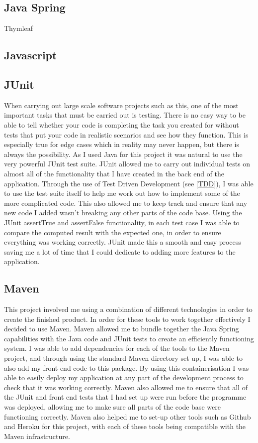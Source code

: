 \subsection{Java Spring \label{JavaSpring}}
Thymleaf

\subsection{Javascript}

\subsection{JUnit}

When carrying out large scale software projects such as this, one of the most important tasks that must be carried out is testing. There is no easy way to be able to tell whether your code is completing the task you created for without tests that put your code in realistic scenarios and see how they function. This is especially true for edge cases which in reality may never happen, but there is always the possibility. As I used Java for this project it was natural to use the very powerful JUnit test suite. JUnit allowed me to carry out individual tests on almost all of the functionality that I have created in the back end of the application. Through the use of Test Driven Development (see \ref{TDD}), I was able to use the test suite itself to help me work out how to implement some of the more complicated code. This also allowed me to keep track and ensure that any new code I added wasn't breaking any other parts of the code base. Using the JUnit assertTrue and assertFalse functionality, in each test case I was able to compare the computed result with the expected one, in order to ensure everything was working correctly. JUnit made this a smooth and easy process saving me a lot of time that I could dedicate to adding more features to the application.

\subsection{Maven}

This project involved me using a combination of different technologies in order to create the finished product. In order for these tools to work together effectively I decided to use Maven. Maven allowed me to bundle together the Java Spring capabilities with the Java code and JUnit tests to create an efficiently functioning system. I was able to add dependencies for each of the tools to the Maven project, and through using the standard Maven directory set up, I was able to also add my front end code to this package. By using this containerisation I was able to easily deploy my application at any part of the development process to check that it was working correctly. Maven also allowed me to ensure that all of the JUnit and front end tests that I had set up were run before the programme was deployed, allowing me to make sure all parts of the code base were functioning correctly. Maven also helped me to set-up other tools such as Github and Heroku for this project, with each of these tools being compatible with the Maven infrastructure.

